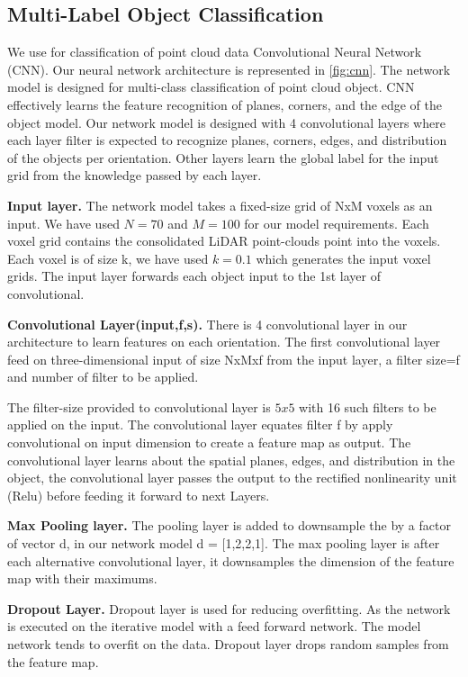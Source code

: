 \subsection{Multi-Label Object Classification} 
We use for classification of point cloud data Convolutional Neural Network (CNN).
Our neural network architecture is represented in \ref{fig:cnn}.
The network model is designed for multi-class classification of point cloud object.
CNN effectively learns the feature recognition of planes, corners, and the edge of the object model.
Our network model is designed with 4 convolutional layers where each layer filter is expected to
recognize planes, corners, edges, and distribution of the objects per orientation.
Other layers learn the global label for the input grid from the knowledge passed by each layer.

\textbf{Input layer.}
The network model takes a fixed-size grid of NxM voxels as an input. We have 
used $N=70$ and $M=100$ for our model requirements. Each voxel grid contains 
the consolidated LiDAR point-clouds point into the voxels. Each voxel is of size k, we 
have used $k=0.1$ which generates the input voxel grids. The input layer forwards each object input to the 1st layer
of convolutional.


\textbf{Convolutional Layer(input,f,s).}
There is 4 convolutional layer in our architecture to learn features on each orientation.
The first convolutional layer feed on three-dimensional input of size NxMxf from the input layer, a filter size=f and number of filter to be applied.

The filter-size provided to convolutional layer is $5x5$ with 16 such filters to be applied on the input.
The convolutional layer equates filter f by apply convolutional on input dimension to create a feature map as output.
The convolutional layer learns about the spatial planes, edges, and distribution in the object, 
the convolutional layer passes the output to the rectified nonlinearity unit (Relu) before feeding
it forward to next Layers.

\textbf{Max Pooling layer.} 
The pooling layer is added to downsample the by a factor of vector d, in
our network model d = [1,2,2,1]. The max pooling layer is after each alternative convolutional
layer, it downsamples the dimension of the feature map with their maximums.

\textbf{Dropout Layer.}
Dropout layer is used for reducing overfitting. As the network is executed on the iterative model with a feed forward network.
The model network tends to overfit on the data. Dropout layer drops random samples from the feature
map.

